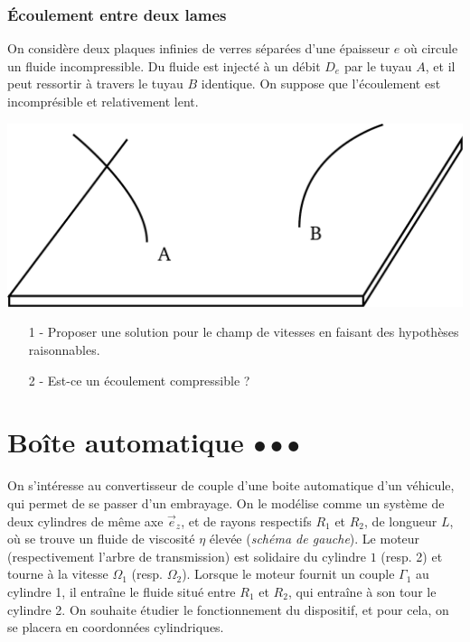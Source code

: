 \documentclass{report}
\begin{document}
\subsubsection*{Écoulement entre deux lames}

On considère deux plaques infinies de verres séparées d'une épaisseur $e$ où circule un fluide incompressible. Du fluide est injecté à un débit $D_e$ par le tuyau $A$, et il peut ressortir à travers le tuyau $B$ identique. On suppose que l'écoulement est incomprésible et relativement lent.

\begin{center}
	\includegraphics[scale=0.25]{plaque.pdf}
\end{center}

\begin{itemize}
	\item[1 - ] Proposer une solution pour le champ de vitesses en faisant des hypothèses raisonnables.
	\item[2 - ] Est-ce un écoulement compressible ?
\end{itemize}

\newpage

\section*{Boîte automatique $\bullet\bullet\bullet$}

On s'intéresse au convertisseur de couple d'une boite automatique d'un véhicule, qui permet de se passer d'un embrayage. On le modélise comme un système de deux cylindres de même axe $\vec{e}_z$, et de rayons respectifs $R_1$ et $R_2$, de longueur $L$, où se trouve un fluide de viscosité $\eta$ élevée (\textit{schéma de gauche}). Le moteur (respectivement l'arbre de transmission) est solidaire du cylindre $1$ (resp. 2) et tourne à la vitesse $\Omega_1$ (resp. $\Omega_2$). Lorsque le moteur fournit un couple $\Gamma_1$ au cylindre 1, il entraîne le fluide situé entre $R_1$ et $R_2$, qui entraîne à son tour le cylindre 2. On souhaite étudier le fonctionnement du dispositif, et pour cela, on se placera en coordonnées cylindriques. 
\end{document}
